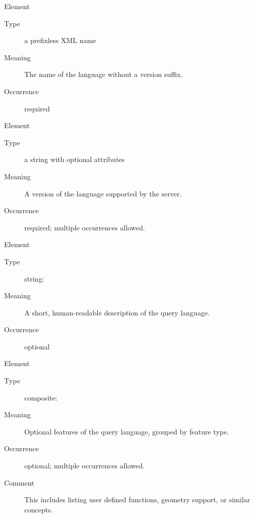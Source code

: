 \documentclass{ivoa}
\begin{document}
\begingroup\small\begin{bigdescription}\item[Element \xmlel{name}]
\begin{description}
\item[Type] a prefixless XML name
\item[Meaning] 
          The name of the language without a version suffix.
          
\item[Occurrence] required

\end{description}
\item[Element \xmlel{version}]
\begin{description}
\item[Type] a string with optional attributes
\item[Meaning] 
            A version of the language supported by the server.
          
\item[Occurrence] required; multiple occurrences allowed.

\end{description}
\item[Element \xmlel{description}]
\begin{description}
\item[Type] string: 
\item[Meaning] 
          A short, human-readable description of the
          query language.
          
\item[Occurrence] optional

\end{description}
\item[Element \xmlel{languageFeatures}]
\begin{description}
\item[Type] composite: 
\item[Meaning] 
            Optional features of the query language, grouped by
            feature type.
          
\item[Occurrence] optional; multiple occurrences allowed.
\item[Comment] 
            This includes listing user defined functions, geometry support,
            or similar concepts.
          

\end{description}


\end{bigdescription}\endgroup
\end{document}
